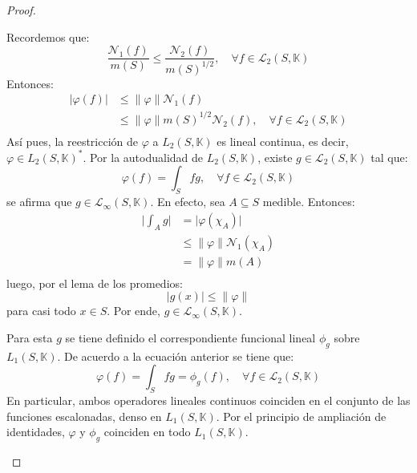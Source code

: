 \documentclass[12pt]{report}
\newcounter{it}
\theoremstyle{largebreak}
\newcommand\abs[1]{\ensuremath{\big|#1\big|}}
\newcommand\norm[1]{\ensuremath{\|#1\|}}
\newcommand{\N}[2]{\ensuremath{\mathcal{N}_{#1}\left(#2\right)}}
\begin{document}
\begin{proof}
\begin{enumerate}
            Recordemos que:
            \begin{equation*}
                \frac{\N{1}{f}}{m(S)}\leq\frac{\N{2}{f}}{m(S)^{1/2}},\quad\forall f\in\mathcal{L}_2(S,\mathbb{K})
            \end{equation*}
            Entonces:
            \begin{equation*}
                \begin{split}
                    \abs{\varphi(f)}&\leq\norm{\varphi}\N{1}{f}\\
                    &\leq\norm{\varphi}m(S)^{1/2}\N{2}{f},\quad\forall f\in\mathcal{L}_2(S,\mathbb{K})\\
                \end{split}
            \end{equation*}
            Así pues, la reestricción de $\varphi$ a $L_2(S,\mathbb{K})$ es lineal continua, es decir, $\varphi\in L_2(S,\mathbb{K})^*$. Por la autodualidad de $L_2(S,\mathbb{K})$, existe $g\in\mathcal{L}_2(S,\mathbb{K})$ tal que:
            \begin{equation}
                \varphi(f)=\int_Sfg,\quad\forall f\in\mathcal{L}_2(S,\mathbb{K})
            \end{equation}
            se afirma que $g\in \mathcal{L}_\infty(S,\mathbb{K})$. En efecto, sea $A\subseteq S$ medible. Entonces:
            \begin{equation*}
                \begin{split}
                    \abs{\int_Ag}&=\abs{\varphi(\chi_A)}\\
                    &\leq \norm{\varphi}\N{1}{\chi_A}\\
                    &=\norm{\varphi}m(A)\\
                \end{split}
            \end{equation*}
            luego, por el lema de los promedios:
            \begin{equation*}
                \abs{g(x)}\leq\norm{\varphi}
            \end{equation*}
            para casi todo $x\in S$. Por ende, $g\in \mathcal{L}_\infty(S,\mathbb{K})$.

            Para esta $g$ se tiene definido el correspondiente funcional lineal $\phi_g$ sobre $L_1(S,\mathbb{K})$. De acuerdo a la ecuación anterior se tiene que:
            \begin{equation*}
                \varphi(f)=\int_Sfg=\phi_g(f),\quad\forall f\in\mathcal{L}_2(S,\mathbb{K})
            \end{equation*}
            En particular, ambos operadores lineales continuos coinciden en el conjunto de las funciones escalonadas, denso en $L_1(S,\mathbb{K})$. Por el principio de ampliación de identidades, $\varphi$ y $\phi_g$ coinciden en todo $L_1(S,\mathbb{K})$.


\end{enumerate}
\end{proof}
\end{document}
